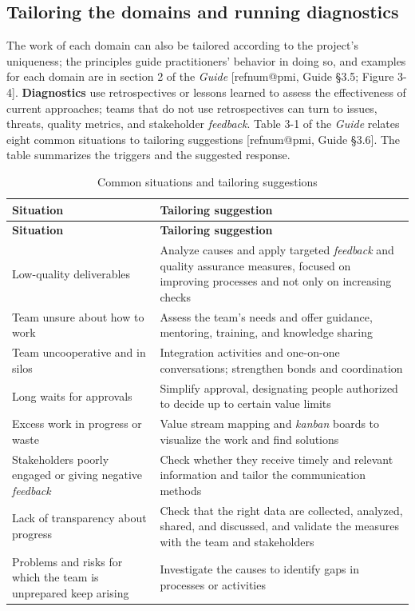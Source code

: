 \documentclass[12pt,a4paper,article,oneside,brazil,english]{abntex2}
\makeatletter
\newcommand{\fontetab}[1]{\par\vspace{3pt}{\small\noindent Source: #1\par}}
\newcommand{\refnum}[1]{\csname refnum@#1\endcsname}
\newcommand{\cit}[1]{[\refnum{#1}]}
\makeatother
\begin{document}
\subsection{Tailoring the domains and running diagnostics}

The work of each domain can also be tailored according to the project's uniqueness; the principles guide practitioners' behavior in doing so, and examples for each domain are in section 2 of the \textit{Guide} [\refnum{pmi}, Guide §3.5; Figure 3-4]. \textbf{Diagnostics} use retrospectives or lessons learned to assess the effectiveness of current approaches; teams that do not use retrospectives can turn to issues, threats, quality metrics, and stakeholder \textit{feedback}. Table 3-1 of the \textit{Guide} relates eight common situations to tailoring suggestions [\refnum{pmi}, Guide §3.6]. The table summarizes the triggers and the suggested response.

\begingroup\SingleSpacing\small
\begin{longtable}{@{}>{\raggedright\arraybackslash}p{}>{\raggedright\arraybackslash}p{}@{}}
\caption{Common situations and tailoring suggestions}\label{tab:t11}\\
\hline
\textbf{Situation} & \textbf{Tailoring suggestion}\\
\hline
\endfirsthead
\hline
\textbf{Situation} & \textbf{Tailoring suggestion}\\
\hline
\endhead
\hline
\endfoot
\hline
\endlastfoot
Low-quality deliverables & Analyze causes and apply targeted \textit{feedback} and quality assurance measures, focused on improving processes and not only on increasing checks\\[3pt]
Team unsure about how to work & Assess the team's needs and offer guidance, mentoring, training, and knowledge sharing\\[3pt]
Team uncooperative and in silos & Integration activities and one-on-one conversations; strengthen bonds and coordination\\[3pt]
Long waits for approvals & Simplify approval, designating people authorized to decide up to certain value limits\\[3pt]
Excess work in progress or waste & Value stream mapping and \textit{kanban} boards to visualize the work and find solutions\\[3pt]
Stakeholders poorly engaged or giving negative \textit{feedback} & Check whether they receive timely and relevant information and tailor the communication methods\\[3pt]
Lack of transparency about progress & Check that the right data are collected, analyzed, shared, and discussed, and validate the measures with the team and stakeholders\\[3pt]
Problems and risks for which the team is unprepared keep arising & Investigate the causes to identify gaps in processes or activities\\[3pt]
\end{longtable}
\endgroup
\fontetab{Prepared by the authors (2026), based on \cit{pmi}.}
\end{document}
